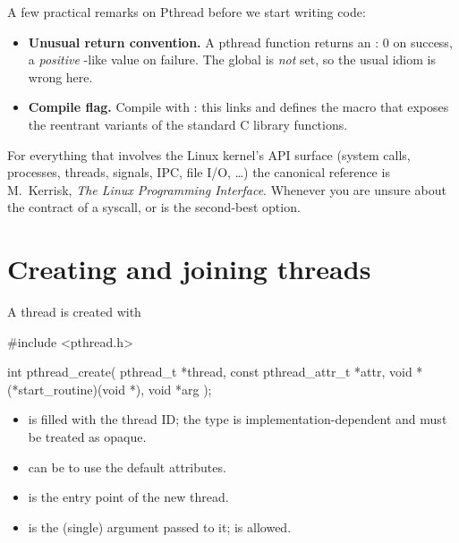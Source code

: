 A few practical remarks on Pthread before we start writing code:

\begin{itemize}
    \item \textbf{Unusual return convention.} A pthread function  returns an : $0$ on success, a \emph{positive} -like value on failure. The global  is \emph{not} set, so the usual idiom  is wrong here.
    \item \textbf{Compile flag.} Compile with : this links  and defines the  macro that exposes the reentrant variants of the standard C library functions.
\end{itemize}

\begin{tipsblock}
For everything that involves the Linux kernel's API surface (system calls, processes, threads, signals, IPC, file I/O, \dots) the canonical reference is M.~Kerrisk, \emph{The Linux Programming Interface}. Whenever you are unsure about the contract of a syscall,  or  is the second-best option.
\end{tipsblock}

\section{Creating and joining threads}

A thread is created with

\begin{codeblock}[language=C]
#include <pthread.h>

int pthread_create( pthread_t *thread,
                    const pthread_attr_t *attr,
                    void *(*start_routine)(void *),
                    void *arg );
\end{codeblock}

\begin{itemize}[noitemsep]
    \item {} is filled with the thread ID; the type  is implementation-dependent and must be treated as opaque.
    \item {} can be  to use the default attributes.
    \item {} is the entry point of the new thread.
    \item {} is the (single) argument passed to it;  is allowed.
\end{itemize}

